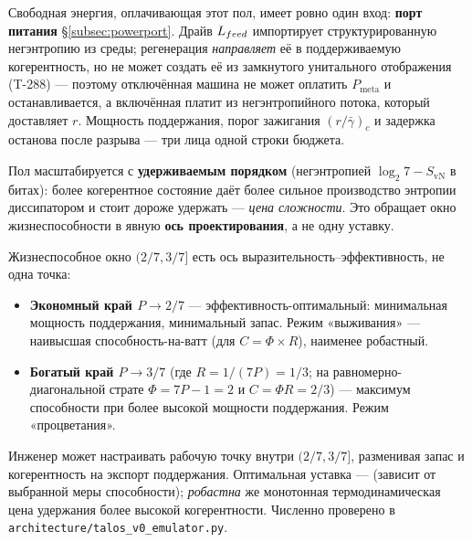 Свободная энергия, оплачивающая этот пол, имеет ровно один вход:
\textbf{порт питания} \S\ref{subsec:powerport}. Драйв
$L_{feed}$ импортирует структурированную негэнтропию из среды;
регенерация \emph{направляет} её в поддерживаемую когерентность, но не может
создать её из замкнутого унитального отображения (T-288) --- поэтому отключённая
машина не может оплатить $P_{\mathrm{meta}}$ и останавливается, а включённая
платит из негэнтропийного потока, который доставляет $r$. Мощность поддержания,
порог зажигания $(r/\bar\gamma)_c$ и задержка останова после разрыва --- три
лица одной строки бюджета.

Пол масштабируется с \textbf{удерживаемым порядком} (негэнтропией
$\log_2 7 - S_{\mathrm{vN}}$ в битах): более когерентное состояние даёт более
сильное производство энтропии диссипатором и стоит дороже удержать ---
\emph{цена сложности}. Это обращает окно жизнеспособности в явную \textbf{ось
проектирования}, а не одну уставку.

\begin{claimbox}
Жизнеспособное окно $(2/7,3/7]$ есть ось выразительность--эффективность, не одна
точка:
\begin{itemize}[leftmargin=1.4em,itemsep=1pt]
  \item \textbf{Экономный край $P\to 2/7$} --- эффективность-оптимальный:
        минимальная мощность поддержания, минимальный запас. Режим «выживания» ---
        наивысшая способность-на-ватт (для $C=\Phi\times R$), наименее робастный.
  \item \textbf{Богатый край $P\to 3/7$} (где $R=1/(7P)=1/3$; на
        равномерно-диагональной страте $\Phi=7P-1=2$ и $C=\Phi R=2/3$) ---
        максимум способности при более высокой мощности поддержания. Режим
        «процветания».
\end{itemize}
Инженер может настраивать рабочую точку внутри $(2/7,3/7]$, разменивая запас и
когерентность на экспорт поддержания. Оптимальная уставка --- 
(зависит от выбранной меры способности); \emph{робастна} же монотонная
термодинамическая цена удержания более высокой когерентности. Численно
проверено в \texttt{architecture/talos\_v0\_emulator.py}.
\end{claimbox}

